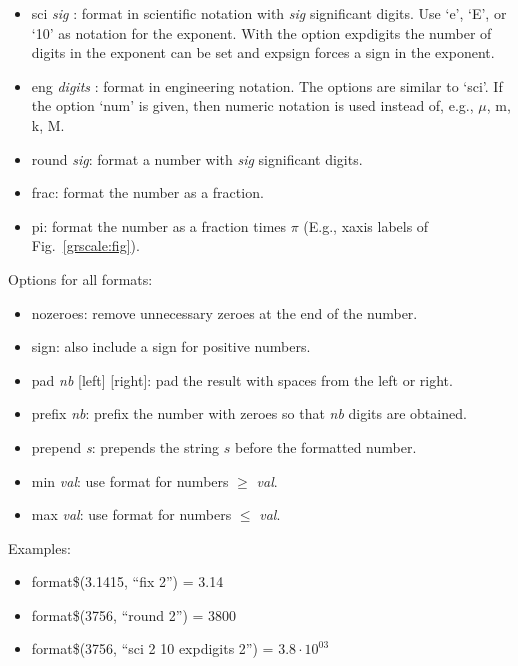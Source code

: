 \begin{commanddescription}
\begin{itemize}
\item {\sf sci} {\it sig} {\sf [e,E,10]} {} {\sf [expsign]}: format in scientific notation with {\it sig} significant digits. Use `e', `E', or `10' as notation for the exponent. With the option {\sf expdigits} the number of digits in the exponent can be set and {\sf expsign} forces a sign in the exponent.

\item {\sf eng} {\it digits} {\sf [e,E,10]} {} {\sf [expsign]} {\sf [num]}: format in engineering notation. The options are similar to `sci'. If the option `num' is given, then numeric notation is used instead of, e.g., $\mu$, m, k, M.

\item {\sf round} {\it sig}: format a number with {\it sig} significant digits.

\item {\sf frac}: format the number as a fraction.

\item {\sf pi}: format the number as a fraction times $\pi$ (E.g., xaxis labels of Fig.~\ref{grscale:fig}).
\end{itemize}

Options for all formats:
\begin{itemize}
\item {\sf nozeroes}: remove unnecessary zeroes at the end of the number.

\item {\sf sign}: also include a sign for positive numbers.

\item {\sf pad {\it nb} [left] [right]}: pad the result with spaces from the left or right.

\item {\sf prefix {\it nb}}: prefix the number with zeroes so that {\it nb} digits are obtained.

\item {\sf prepend {\it s}}: prepends the string $s$ before the formatted number.

\item {\sf min {\it val}}: use format for numbers $\ge$ {\it val}.

\item {\sf max {\it val}}: use format for numbers $\le$ {\it val}.
\end{itemize}

Examples:
\begin{itemize}
\item format\$(3.1415, ``fix 2'') = 3.14
\item format\$(3756, ``round 2'') = 3800
\item format\$(3756, ``sci 2 10 expdigits 2'') = $3.8\cdot10^{03}$
\end{itemize}


\end{commanddescription}
